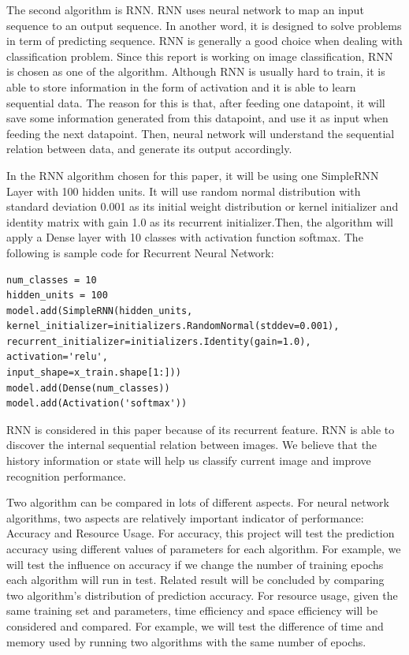 \documentclass[letterpaper]{article} %
\begin{document}
The second algorithm is RNN. RNN uses neural network to map an input sequence to an output sequence. In another word, it is designed to solve problems in term of predicting sequence. RNN is generally a good choice when dealing with classification problem. Since this report is working on image classification, RNN is chosen as one of the algorithm.
Although RNN is usually hard to train, it is able to store information in the form of activation and it is able to learn sequential data. The reason for this is that, after feeding one datapoint, it will save some information generated from this datapoint, and use it as input when feeding the next datapoint. Then, neural network will understand the sequential relation between data, and generate its output accordingly.

In the RNN algorithm chosen for this paper, it will be using 
one SimpleRNN Layer with 100 hidden units. It will use random normal distribution with standard deviation 0.001 as its initial weight distribution or kernel initializer and identity matrix with gain 1.0 as its recurrent initializer.Then, the algorithm will apply a Dense layer with 10 classes with activation function softmax. The following is sample code for Recurrent Neural Network:

\begin{lstlisting}[columns=fullflexible, keepspaces=true, stepnumber=1]
num_classes = 10
hidden_units = 100
model.add(SimpleRNN(hidden_units,
kernel_initializer=initializers.RandomNormal(stddev=0.001),
recurrent_initializer=initializers.Identity(gain=1.0),
activation='relu',
input_shape=x_train.shape[1:]))
model.add(Dense(num_classes))
model.add(Activation('softmax'))
\end{lstlisting}
RNN is considered in this paper because of its recurrent feature. RNN is able to discover the internal sequential relation between images. We believe that the history information or state will help us classify current image and improve recognition performance.

Two algorithm can be compared in lots of different aspects. For neural network algorithms, two aspects are relatively important indicator of performance: Accuracy and Resource Usage. For accuracy, this project will test the prediction accuracy using different values of parameters for each algorithm. For example, we will test the influence on accuracy if we change the number of training epochs each algorithm will run in test. Related result will be concluded by comparing two algorithm’s distribution of prediction accuracy. For resource usage, given the same training set and parameters, time efficiency and space efficiency will be considered and compared. For example, we will test the difference of time and memory used by running two algorithms with the same number of epochs.
\end{document}
